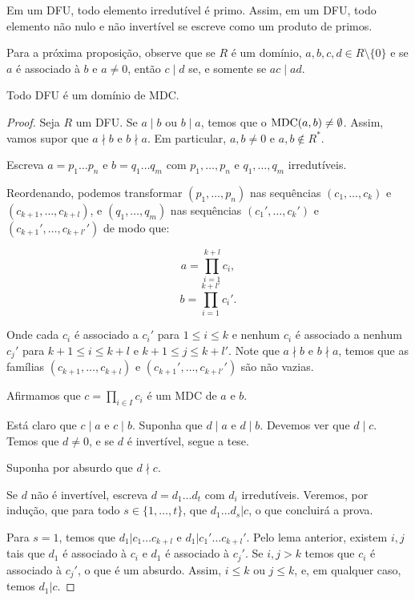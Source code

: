 \begin{corol}\label{corol:DFUprime}
Em um DFU, todo elemento irredutível é primo.
Assim, em um DFU, todo elemento não nulo e não invertível se escreve como um produto de primos.
\end{corol}

Para a próxima proposição, observe que se $R$ é um domínio, $a, b, c, d \in R\setminus \{0\}$ e se $a$ é associado à $b$ e $a\neq 0$, então $c\mid d$ se, e somente se $ac\mid ad$.
\begin{prop}
    Todo DFU é um domínio de MDC.
\end{prop}
\begin{proof}
Seja $R$ um DFU.
Se $a\mid b$ ou $b\mid a$, temos que o $\operatorname{MDC}(a, b)\neq \emptyset$.
Assim, vamos supor que $a\nmid b$ e $b\nmid a$. Em particular, $a, b \neq 0$ e $a, b \notin R^*$.

Escreva $a=p_1\dots p_n$ e $b=q_1\dots q_m$ com $p_1, \dots, p_n$ e $q_1, \dots, q_m$ irredutíveis.

Reordenando, podemos transformar $(p_1, \dots, p_n)$ nas sequências $(c_1, \dots, c_k)$ e $(c_{k+1}, \dots, c_{k+l})$, e $(q_1, \dots, q_m)$ nas sequências $(c_1', \dots, c_k')$ e $(c_{k+1}', \dots, c_{k+l'}')$ de modo que:

\[a=\prod_{i=1}^{k+l}c_i,\]
\[b=\prod_{i=1}^{k+l'}c_i'.\]

Onde cada $c_i$ é associado a $c_i'$ para $1\leq i\leq k$ e nenhum $c_i$ é associado a nenhum $c_j'$ para $k+1\leq i\leq k+l$ e $k+1\leq j\leq k+l'$.
Note que $a\nmid b$ e $b\nmid  a$, temos que as famílias $(c_{k+1}, \dots, c_{k+l})$ e $(c_{k+1}', \dots, c_{k+l'}')$ são não vazias.


Afirmamos que $c=\prod_{i \in I} c_i$ é um MDC de $a$ e $b$.

Está claro que $c\mid a$ e $c\mid b$.
Suponha que $d\mid a$ e $d\mid b$.
Devemos ver que $d\mid c$.
Temos que $d\neq 0$, e se $d$ é invertível, segue a tese.

Suponha por absurdo que $d\nmid  c$.

Se $d$ não é invertível, escreva $d=d_1\dots d_t$ com $d_i$ irredutíveis. Veremos, por indução, que para todo $s\in\{1, \dots, t\}$, que $d_1\dots d_s|c$, o que concluirá a prova.

Para $s=1$, temos que $d_1|c_1\dots c_{k+l}$ e $d_1|c_1'\dots c_{k+l}'$. Pelo lema anterior, existem $i, j$ tais que $d_1$ é associado à $c_i$ e $d_1$ é associado à $c_j'$. Se $i, j>k$ temos que $c_i$ é associado à $c_j'$, o que é um absurdo. Assim, $i\leq k$ ou $j\leq k$, e, em qualquer caso, temos $d_1|c$.


\end{proof}
